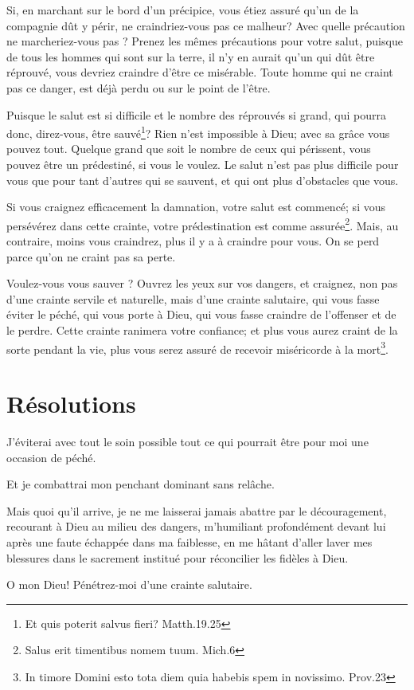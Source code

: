 \documentclass[instructions.tex]{subfiles}
\begin{document}
Si, en marchant sur le bord d'un précipice, vous étiez assuré qu'un de la compagnie dût y périr, ne craindriez-vous pas ce malheur? Avec quelle précaution ne marcheriez-vous pas ? Prenez les mêmes précautions pour votre salut, puisque de tous les hommes qui sont sur la terre, il n'y en aurait qu'un qui dût être réprouvé, vous devriez craindre d'être ce misérable. Toute homme qui ne craint pas ce danger, est déjà perdu ou sur le point de l'être.

Puisque le salut est si difficile et le nombre des réprouvés si grand, qui pourra donc, direz-vous, être sauvé\footnote{Et quis poterit salvus fieri? Matth.19.25}? Rien n'est impossible à Dieu; avec sa grâce vous pouvez tout. Quelque grand que soit le nombre de ceux qui périssent, vous pouvez être un prédestiné, si vous le voulez. Le salut n'est pas plus difficile pour vous que pour tant d'autres qui se sauvent, et qui ont plus d'obstacles que vous.

Si vous craignez efficacement la damnation, votre salut est commencé; si vous persévérez dans cette crainte, votre prédestination est comme assurée\footnote{Salus erit timentibus nomem tuum. Mich.6}. Mais, au contraire, moins vous craindrez, plus il y a à craindre pour vous. On se perd parce qu'on ne craint pas sa perte. 

Voulez-vous vous sauver ? Ouvrez les yeux sur vos dangers, et craignez, non pas d'une crainte servile et naturelle, mais d'une crainte salutaire, qui vous fasse éviter le péché, qui vous porte à Dieu, qui vous fasse craindre de l'offenser et de le perdre. Cette crainte ranimera votre confiance; et plus vous aurez craint de la sorte pendant la vie, plus vous serez assuré de recevoir miséricorde à la mort\footnote{In timore Domini esto tota diem quia habebis spem in novissimo. Prov.23}.

\section{Résolutions}

\primo J'éviterai avec tout le soin possible tout ce qui pourrait être pour moi une occasion de péché.

\secundo Et je combattrai mon penchant dominant sans relâche. 

\tertio Mais quoi qu'il arrive, je ne me laisserai jamais abattre par le découragement, recourant à Dieu au milieu des dangers, m'humiliant profondément devant lui après une faute échappée dans ma faiblesse, en me hâtant d'aller laver mes blessures dans le sacrement institué pour réconcilier les fidèles à Dieu.

O mon Dieu! Pénétrez-moi d'une crainte salutaire.
\end{document}
